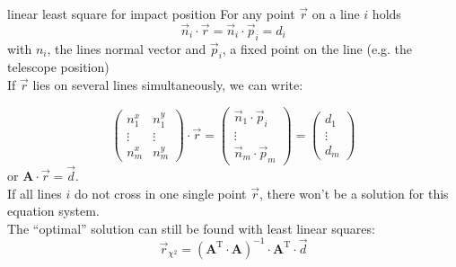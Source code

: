 \documentclass[8pt]{beamer}
\begin{document}
    \begin{frame}{linear least square for impact position}
        For any point $\vec r$ on a line $i$ holds
        $$\vec n_i \cdot \vec r = \vec n_i \cdot \vec p_i = d_i $$
        with $n_i$, the lines normal vector and $\vec p_i$, a fixed point on the line
        (e.g. the telescope position)\\
        If $\vec r$ lies on several lines simultaneously, we can write:

        $$
        \begin{pmatrix}
            n^x_1  & n^y_1  \\
            \vdots & \vdots \\
            n^x_m  & n^y_m
        \end{pmatrix} \cdot \vec r =
        \begin{pmatrix}
            \vec n_1 \cdot \vec p_i \\
                \vdots \\
            \vec n_m \cdot \vec p_m
        \end{pmatrix} =
        \begin{pmatrix}
            d_1    \\
            \vdots \\
            d_m
        \end{pmatrix}
        $$
        or $\mathbf{A} \cdot \vec r = \vec d$. \\
        If all lines $i$ do not cross in one single point $\vec r$, there won't be a solution for this equation system.\\
        The ``optimal'' solution can still be found with least linear squares:\\
        $$\vec r_{\chi^2} = (\mathbf{A}^\mathrm{T} \cdot \mathbf{A})^{-1} \cdot \mathbf{A}^\mathrm{T} \cdot \vec d$$

    \end{frame}
\end{document}
